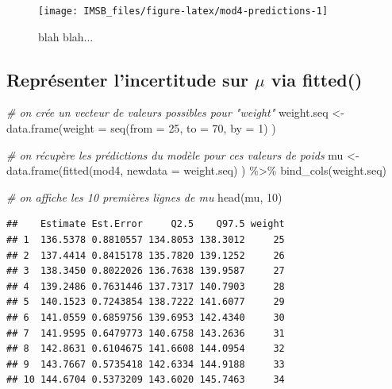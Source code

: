 \documentclass[
  a4paper,11pt,twoside,onecolumn,openright,final,oldfontcommands]{memoir}
\newenvironment{Shaded}{\begin{snugshade}}{\end{snugshade}}
\newcommand{\AttributeTok}[1]{\textcolor[rgb]{0.77,0.63,0.00}{#1}}
\newcommand{\CommentTok}[1]{\textcolor[rgb]{0.56,0.35,0.01}{\textit{#1}}}
\newcommand{\DecValTok}[1]{\textcolor[rgb]{0.00,0.00,0.81}{#1}}
\newcommand{\FunctionTok}[1]{\textcolor[rgb]{0.00,0.00,0.00}{#1}}
\newcommand{\NormalTok}[1]{#1}
\newcommand{\OtherTok}[1]{\textcolor[rgb]{0.56,0.35,0.01}{#1}}
\newcommand{\SpecialCharTok}[1]{\textcolor[rgb]{0.00,0.00,0.00}{#1}}
\theoremstyle{definition}
\theoremstyle{definition}
\theoremstyle{definition}
\theoremstyle{definition}
\theoremstyle{remark}
\begin{document}
\begin{figure}[!htb]

{\centering \texttt{[image: IMSB\_files/figure-latex/mod4-predictions-1]} 

}

\caption{blah blah...}\label{fig:mod4-predictions}
\end{figure}

\hypertarget{repruxe9senter-lincertitude-sur-mu-via-fitted}{%
\subsection{\texorpdfstring{Représenter l'incertitude sur \(\mu\) via fitted()}{Représenter l'incertitude sur \textbackslash mu via fitted()}}\label{repruxe9senter-lincertitude-sur-mu-via-fitted}}

\begin{Shaded}
\begin{Highlighting}[]
\CommentTok{\# on crée un vecteur de valeurs possibles pour "weight"}
\NormalTok{weight.seq }\OtherTok{\textless{}{-}} \FunctionTok{data.frame}\NormalTok{(}\AttributeTok{weight =} \FunctionTok{seq}\NormalTok{(}\AttributeTok{from =} \DecValTok{25}\NormalTok{, }\AttributeTok{to =} \DecValTok{70}\NormalTok{, }\AttributeTok{by =} \DecValTok{1}\NormalTok{) )}

\CommentTok{\# on récupère les prédictions du modèle pour ces valeurs de poids}
\NormalTok{mu }\OtherTok{\textless{}{-}} \FunctionTok{data.frame}\NormalTok{(}\FunctionTok{fitted}\NormalTok{(mod4, }\AttributeTok{newdata =}\NormalTok{ weight.seq) ) }\SpecialCharTok{\%\textgreater{}\%} \FunctionTok{bind\_cols}\NormalTok{(weight.seq)}

\CommentTok{\# on affiche les 10 premières lignes de mu}
\FunctionTok{head}\NormalTok{(mu, }\DecValTok{10}\NormalTok{)}
\end{Highlighting}
\end{Shaded}

\begin{verbatim}
##    Estimate Est.Error     Q2.5    Q97.5 weight
## 1  136.5378 0.8810557 134.8053 138.3012     25
## 2  137.4414 0.8415178 135.7820 139.1252     26
## 3  138.3450 0.8022026 136.7638 139.9587     27
## 4  139.2486 0.7631446 137.7317 140.7903     28
## 5  140.1523 0.7243854 138.7222 141.6077     29
## 6  141.0559 0.6859756 139.6953 142.4340     30
## 7  141.9595 0.6479773 140.6758 143.2636     31
## 8  142.8631 0.6104675 141.6608 144.0954     32
## 9  143.7667 0.5735418 142.6334 144.9188     33
## 10 144.6704 0.5373209 143.6020 145.7463     34
\end{verbatim}
\end{document}
